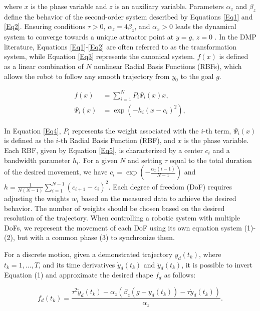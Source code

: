 \documentclass[conference]{IEEEtran}
\begin{document}
where $x$ is the phase variable and $z$ is an auxiliary variable. Parameters $\alpha_z$ and $\beta_z$ define the behavior of the second-order system described by Equations \eqref{Eq1} and \eqref{Eq2}. Ensuring conditions $\tau > 0$, $\alpha_z = 4\beta_z$, and $\alpha_x > 0$ leads the dynamical system  to converge towards a unique attractor point at $y=g$, $z=0$ \cite{ijspeert_dynamical_2013}. In the DMP literature, Equations \eqref{Eq1}-\eqref{Eq2} are often referred to as the transformation system, while Equation \eqref{Eq3} represents the canonical system. $f(x)$ is defined as a linear combination of $N$ nonlinear Radial Basis Functions (RBFs), which allows the robot to follow any smooth trajectory from  $y_0$ to the goal $g$.

\begin{align}
f(x) &= \sum_{i=1}^{N} P_i \Psi_i(x) x,  \label{Eq4}\\
\Psi_i(x) &= \exp \left(-h_i (x - c_i)^2\right),  \label{Eq5}
\end{align}

In Equation \eqref{Eq4},  $P_i$ represents the weight associated with the $i$-th term, $\Psi_i(x)$ is defined as the $i$-th Radial Basis Function (RBF), and $x$ is the phase variable. Each RBF, given by Equation \eqref{Eq5}, is characterized by a center $c_i$ and a bandwidth parameter $h_i$.
For a given $N$ and setting $\tau$ equal to the total duration of the desired movement, we have $c_i = \exp\left(-\frac{\alpha_x(i-1)}{N-1}\right)$ and $h = \frac{1}{N(N-1)}\sum_{i=1}^{N-1}(c_{i+1}-c_i)^2$. Each degree of freedom (DoF) requires adjusting the weights $w_i$ based on the measured data to achieve the desired behavior. The number of weights should be chosen based on the desired resolution of the trajectory. When controlling a robotic system with multiple DoFs, we represent the movement of each DoF using its own equation system (1)-(2), but with a common phase (3) to synchronize them.

For a discrete motion, given a demonstrated trajectory $y_d(t_k)$, where $t_k = 1, \ldots, T$, and its time derivatives $\dot{y}_d(t_k)$ and $\ddot{y}_d(t_k)$, it is possible to invert Equation (1) and approximate the desired shape $f_d$ as follows:

\begin{equation}
f_d(t_k) = \frac{\tau^2 \ddot{y}_d(t_k) - \alpha_z \left(\beta_z (g - y_d(t_k)) - \tau \dot{y}_d(t_k)\right)}{\alpha_z}.
\label{eq:forcing-term}
\end{equation}
\end{document}
